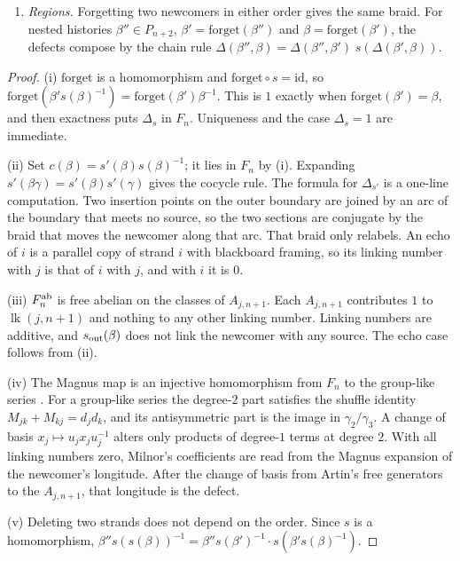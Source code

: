 \documentclass[11pt]{article}
\theoremstyle{definition}\newtheorem{definition}[theorem]{Definition}\newtheorem{remark}[theorem]{Remark}\newtheorem{example}[theorem]{Example}\newtheorem{problem}[theorem]{Open problem}\crefname{problem}{Problem}{Problems}
\begin{document}
\begin{proposition}
\begin{enumerate}
\item[(v)] \emph{Regions.} Forgetting two newcomers in either order gives the same braid. For nested histories $\beta''\in P_{n+2}$, $\beta'=\mathrm{forget}(\beta'')$ and $\beta=\mathrm{forget}(\beta')$, the defects compose by the chain rule $\Delta(\beta'',\beta)=\Delta(\beta'',\beta')\;s(\Delta(\beta',\beta))$.
\end{enumerate}
\end{proposition}

\begin{proof}
(i) $\mathrm{forget}$ is a homomorphism and $\mathrm{forget}\circ s=\mathrm{id}$, so $\mathrm{forget}(\beta's(\beta)^{-1})=\mathrm{forget}(\beta')\beta^{-1}$. This is $1$ exactly when $\mathrm{forget}(\beta')=\beta$, and then exactness puts $\Delta_s$ in $F_n$. Uniqueness and the case $\Delta_s=1$ are immediate.

(ii) Set $c(\beta)=s'(\beta)s(\beta)^{-1}$; it lies in $F_n$ by (i). Expanding $s'(\beta\gamma)=s'(\beta)s'(\gamma)$ gives the cocycle rule. The formula for $\Delta_{s'}$ is a one-line computation. Two insertion points on the outer boundary are joined by an arc of the boundary that meets no source, so the two sections are conjugate by the braid that moves the newcomer along that arc. That braid only relabels. An echo of $i$ is a parallel copy of strand $i$ with blackboard framing, so its linking number with $j$ is that of $i$ with $j$, and with $i$ it is $0$.

(iii) $F_n^{\rm ab}$ is free abelian on the classes of $A_{j,n+1}$. Each $A_{j,n+1}$ contributes $1$ to $\operatorname{lk}(j,n+1)$ and nothing to any other linking number. Linking numbers are additive, and $s_{\rm out}(\beta)$ does not link the newcomer with any source. The echo case follows from (ii).

(iv) The Magnus map is an injective homomorphism from $F_n$ to the group-like series \cite{MagnusKarrassSolitar1966}. For a group-like series the degree-$2$ part satisfies the shuffle identity $M_{jk}+M_{kj}=d_jd_k$, and its antisymmetric part is the image in $\gamma_2/\gamma_3$. A change of basis $x_j\mapsto u_jx_ju_j^{-1}$ alters only products of degree-$1$ terms at degree $2$. With all linking numbers zero, Milnor's coefficients are read from the Magnus expansion of the newcomer's longitude. After the change of basis from Artin's free generators to the $A_{j,n+1}$, that longitude is the defect.

(v) Deleting two strands does not depend on the order. Since $s$ is a homomorphism, $\beta''s(s(\beta))^{-1}=\beta''s(\beta')^{-1}\cdot s(\beta's(\beta)^{-1})$.
\end{proof}
\end{document}
